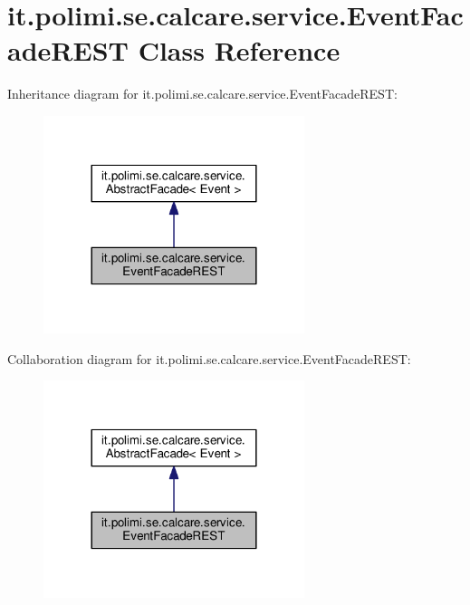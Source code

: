 \hypertarget{classit_1_1polimi_1_1se_1_1calcare_1_1service_1_1EventFacadeREST}{}\section{it.\+polimi.\+se.\+calcare.\+service.\+Event\+Facade\+R\+E\+S\+T Class Reference}
\label{classit_1_1polimi_1_1se_1_1calcare_1_1service_1_1EventFacadeREST}


Inheritance diagram for it.\+polimi.\+se.\+calcare.\+service.\+Event\+Facade\+R\+E\+S\+T\+:
\nopagebreak
\begin{figure}[H]
\begin{center}
\leavevmode
\includegraphics[width=216pt]{classit_1_1polimi_1_1se_1_1calcare_1_1service_1_1EventFacadeREST__inherit__graph}
\end{center}
\end{figure}


Collaboration diagram for it.\+polimi.\+se.\+calcare.\+service.\+Event\+Facade\+R\+E\+S\+T\+:
\nopagebreak
\begin{figure}[H]
\begin{center}
\leavevmode
\includegraphics[width=216pt]{classit_1_1polimi_1_1se_1_1calcare_1_1service_1_1EventFacadeREST__coll__graph}
\end{center}
\end{figure}
